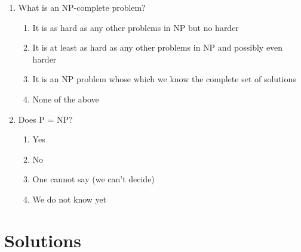 \documentclass[11pt]{article}
\begin{document}
\begin{enumerate}
\item What is an NP-complete problem?
\begin{enumerate}
\item It is as hard as any other problems in NP but no harder
\item It is at least as hard as any other problems in NP and possibly even harder
\item It is an NP problem whose which we know the complete set of solutions
\item None of the above
\end{enumerate}

\item Does P = NP?
\begin{enumerate}
\item Yes
\item No
\item One cannot say (we can't decide)
\item We do not know yet
\end{enumerate}
\end{enumerate}

\section{Solutions}
\label{sec:org9e182ac}
\end{document}
